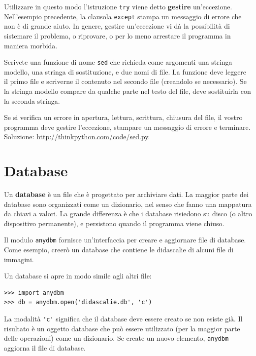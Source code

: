 \documentclass[10pt]{book}
\begin{document}
Utilizzare in questo modo l'istruzione {\tt try} viene detto {\bf
gestire} un'eccezione. Nell'esempio precedente, la clausola {\tt except} stampa un messaggio di errore che non è di grande aiuto. In genere, gestire un'eccezione vi dà la possibilità di sistemare il problema, o riprovare, o per lo meno arrestare il programma in maniera morbida.

\vspace{0.2in}
\begin{exercise}

Scrivete una funzione di nome {\tt sed} che richieda come argomenti una stringa modello, una stringa di sostituzione, e due nomi di file. La funzione deve leggere il primo file e scriverne il contenuto nel secondo file (creandolo se necessario). Se la stringa modello compare da qualche parte nel testo del file, deve sostituirla con la seconda stringa.

Se si verifica un errore in apertura, lettura, scrittura, chiusura del file, il vostro programma deve gestire l'eccezione, stampare un messaggio di errore e terminare. Soluzione: \url{http://thinkpython.com/code/sed.py}.

\end{exercise}


\section{Database}

Un {\bf database} è un file che è progettato per archiviare dati. La maggior parte dei database sono organizzati come un dizionario, nel senso che fanno una mappatura da chiavi a valori. La grande differenza è che i database risiedono su disco (o altro dispositivo permanente), e persistono quando il programma viene chiuso.

Il modulo {\tt anydbm} fornisce un'interfaccia per creare e aggiornare file di database. Come esempio, creerò un database che contiene le didascalie di alcuni file di immagini.

Un database si apre in modo simile agli altri file:

\begin{verbatim}
>>> import anydbm
>>> db = anydbm.open('didascalie.db', 'c')
\end{verbatim}
%
La modalità \verb"'c'" significa che il database deve essere creato se non esiste già. Il risultato è un oggetto database che può essere utilizzato (per la maggior parte delle operazioni) come un dizionario. Se create un nuovo elemento, {\tt anydbm} aggiorna il file di database.
\end{document}

